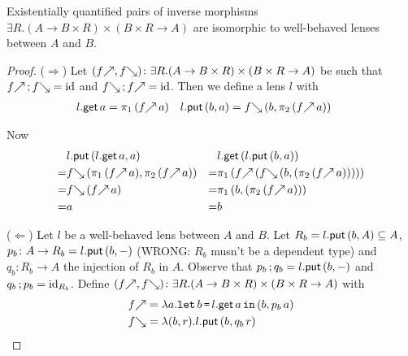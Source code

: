 \documentclass[runningheads,envcountsame]{llncs}
\begin{document}
    \begin{lemma} \label{lem:lensex-is-lens}
        Existentially quantified pairs of inverse morphisms $\exists R. (A \to B \times R) \times (B \times R \to A)$ are isomorphic to well-behaved lenses between $A$ and $B$.
    \end{lemma}
    \begin{proof}
        ($\Longrightarrow$) Let $(\f{f}, \b{f})\colon \exists R. (A \to B \times R) \times (B \times R \to A)$ be such that $\comp{\f{f}}{\b{f}} = \id$ and $\comp{\b{f}}{\f{f}} = \id$. Then we define a lens $l$ with \begin{align*}
            \lget{l}\,a &= \pi_1\,(\f{f}\,a) &
            \lput{l}\,(b, a) &= \b{f}\,(b, \pi_2\,(\f{f}\,a))\;
        \end{align*}
        
        Now
        \begin{align*}
            & \eapp{\lput{l}}{\epair{\eapp{\lget{l}}{a}}{a}} &
            & \eapp{\lget{l}}{(\eapp{\lput{l}}{\epair{b}{a}})} \\
          = & \eapp{\b{f}}{\epair{\eapp{\pi_1}{(\eapp{\f{f}}{a})}}{\eapp{\pi_2}{(\eapp{\f{f}}{a})}}} &
          = & \eapp{\pi_1}{(\eapp{\f{f}}{(\eapp{\b{f}}{\epair{b}{(\eapp{\pi_2}{(\eapp{\f{f}}{a})})}})})} \\
          = & \eapp{\b{f}}{(\eapp{\f{f}}{a})} &
          = & \eapp{\pi_1}{\epair{b}{(\eapp{\pi_2}{(\eapp{\f{f}}{a})})}} \\
          = & a & = & b 
        \end{align*}
        
        ($\Longleftarrow$) Let $l$ be a well-behaved lens between $A$ and $B$. Let $R_b = {l}.\mathsf{put}\,(b, A) \subseteq A$, $p_b\colon A \to R_b = {l}.\mathsf{put}\,(b, -)$ (WRONG: $R_b$ musn't be a dependent type) and $q_b\colon R_b \to A$ the injection of $R_b$ in $A$. Observe that $\comp{p_b}{q_b} = \eapp{\lput{l}}{\epair{b}{-}}$ and $\comp{q_b}{p_b} = \id_{R_b}$.
        Define $(\f{f}, \b{f})\colon \exists R. (A \to B \times R) \times (B \times R \to A)$ with \begin{align*}
            \f{f} &= \elam{a}{\elet{b}{\eapp{\lget{l}}{a}}{\epair{b}{\eapp{p_b}{a}}}} \\
            \b{f} &= \elam{\epair{b}{r}}{\eapp{\lput{l}}{\epair{b}{\eapp{q_b}{r}}}}
        \end{align*}
        

\end{proof}
\end{document}
